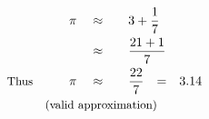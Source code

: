 \begin{alignat*}{5}
&\,&\pi\quad&\approx\quad&&3+\frac{1}{7}\\
&\,&\,&\approx&&\frac{21+1}{7}\\
&\small\text{Thus}\qquad&\pi\quad&\approx&&\frac{22}{7}\rlap{\quad=\quad3.14}\\
&\rlap{\qquad\quad\small\text{(valid approximation)}}
\end{alignat*}
